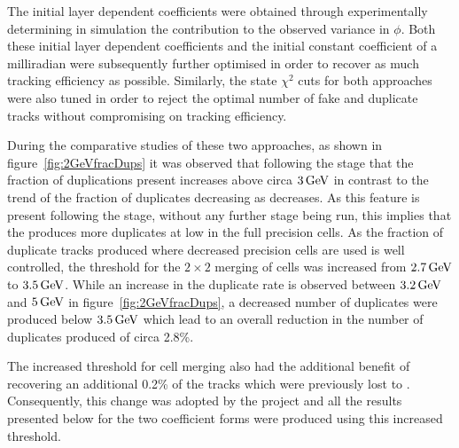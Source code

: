 The initial layer dependent coefficients were obtained through experimentally determining in simulation the \MS  contribution to the observed variance in $\phi$.
Both these initial layer dependent coefficients and the initial constant coefficient of a milliradian were subsequently further optimised in order to recover as much tracking efficiency as  possible.
Similarly, the \KF state $\chi^{2}$ cuts for both approaches were also tuned in order to reject the optimal number of fake and duplicate tracks without compromising on tracking efficiency.

During the comparative studies of these two approaches, as shown in figure~\ref{fig:2GeVfracDups} it was observed that following the \DR stage that the fraction of duplications present increases above circa $3\,\text{Ge\hspace{-.08em}V}$ in contrast to the trend of the fraction of duplicates decreasing as \pT decreases.
As this feature is present following the \HT stage, without any further stage being run, this implies that the \HT produces more duplicates at low \pT in the full precision cells.
As the fraction of duplicate tracks produced where decreased precision \HT cells are used is well controlled, the \pT threshold for the $2 \times 2$ merging of \HT cells was increased from $2.7\,\text{Ge\hspace{-.08em}V}$ to $3.5\,\text{Ge\hspace{-.08em}V}$.
While an increase in the duplicate rate is observed between $3.2\,\text{Ge\hspace{-.08em}V}$ and $5\,\text{Ge\hspace{-.08em}V}$ in figure~\ref{fig:2GeVfracDups}, a decreased number of duplicates were produced below $3.5\,\text{Ge\hspace{-.08em}V}$ which lead to an overall reduction in the number of duplicates produced of circa 2.8\%.

The increased \pT threshold for \HT cell merging also had the additional benefit of recovering an additional 0.2\% of the tracks which were previously lost to \MS.
Consequently, this change was adopted by the project and all the results presented below for the two \MS coefficient forms were produced using this increased threshold. 

